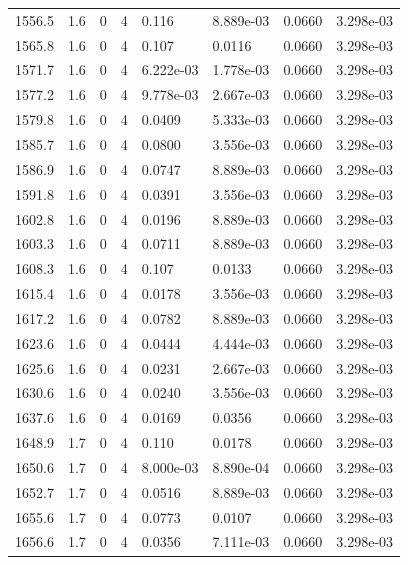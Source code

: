 \documentclass[preview]{standalone}
\begin{document}
{{{{{{{{{\begin{tabular}{L{1.2cm}C{1.2cm} C{0.3cm}C{0.5cm} C{1.4cm}C{1.4cm} C{1.4cm}C{1.4cm}}
  1556.5  &   1.6  & 0     &  4 &  0.116  & 8.889e-03  & 0.0660 &  3.298e-03   \\ 
  1565.8  &   1.6  & 0     &  4 &  0.107  & 0.0116  & 0.0660 &  3.298e-03   \\ 
  1571.7  &   1.6  & 0     &  4 &  6.222e-03  & 1.778e-03  & 0.0660 &  3.298e-03   \\ 
  1577.2  &   1.6  & 0     &  4 &  9.778e-03  & 2.667e-03  & 0.0660 &  3.298e-03   \\ 
  1579.8  &   1.6  & 0     &  4 &  0.0409  & 5.333e-03  & 0.0660 &  3.298e-03   \\ 
  1585.7  &   1.6  & 0     &  4 &  0.0800  & 3.556e-03  & 0.0660 &  3.298e-03   \\ 
  1586.9  &   1.6  & 0     &  4 &  0.0747  & 8.889e-03  & 0.0660 &  3.298e-03   \\ 
  1591.8  &   1.6  & 0     &  4 &  0.0391  & 3.556e-03  & 0.0660 &  3.298e-03   \\ 
  1602.8  &   1.6  & 0     &  4 &  0.0196  & 8.889e-03  & 0.0660 &  3.298e-03   \\ 
  1603.3  &   1.6  & 0     &  4 &  0.0711  & 8.889e-03  & 0.0660 &  3.298e-03   \\ 
  1608.3  &   1.6  & 0     &  4 &  0.107  & 0.0133  & 0.0660 &  3.298e-03   \\ 
  1615.4  &   1.6  & 0     &  4 &  0.0178  & 3.556e-03  & 0.0660 &  3.298e-03   \\ 
  1617.2  &   1.6  & 0     &  4 &  0.0782  & 8.889e-03  & 0.0660 &  3.298e-03   \\ 
  1623.6  &   1.6  & 0     &  4 &  0.0444  & 4.444e-03  & 0.0660 &  3.298e-03   \\ 
  1625.6  &   1.6  & 0     &  4 &  0.0231  & 2.667e-03  & 0.0660 &  3.298e-03   \\ 
  1630.6  &   1.6  & 0     &  4 &  0.0240  & 3.556e-03  & 0.0660 &  3.298e-03   \\ 
  1637.6  &   1.6  & 0     &  4 &  0.0169  & 0.0356  & 0.0660 &  3.298e-03   \\ 
  1648.9  &   1.7  & 0     &  4 &  0.110  & 0.0178  & 0.0660 &  3.298e-03   \\ 
  1650.6  &   1.7  & 0     &  4 &  8.000e-03  & 8.890e-04  & 0.0660 &  3.298e-03   \\ 
  1652.7  &   1.7  & 0     &  4 &  0.0516  & 8.889e-03  & 0.0660 &  3.298e-03   \\ 
  1655.6  &   1.7  & 0     &  4 &  0.0773  & 0.0107  & 0.0660 &  3.298e-03   \\ 
  1656.6  &   1.7  & 0     &  4 &  0.0356  & 7.111e-03  & 0.0660 &  3.298e-03   \\ 

\end{tabular}}}}}}}}}}
\end{document}
